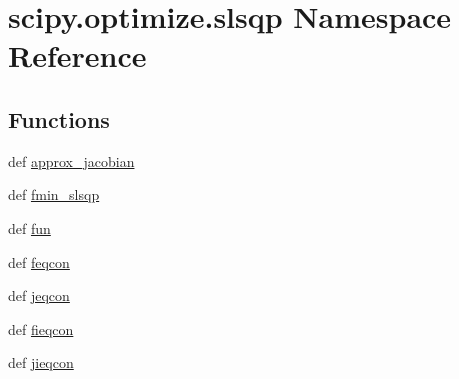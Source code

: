 \hypertarget{namespacescipy_1_1optimize_1_1slsqp}{}\section{scipy.\+optimize.\+slsqp Namespace Reference}
\label{namespacescipy_1_1optimize_1_1slsqp}
\subsection*{Functions}
\begin{DoxyCompactItemize}
\item 
def \hyperlink{namespacescipy_1_1optimize_1_1slsqp_a8bd7e9e2d35f751df61a44c3e0eb445a}{approx\+\_\+jacobian}
\item 
def \hyperlink{namespacescipy_1_1optimize_1_1slsqp_ac3dab30d04519a7fb85a62039512e338}{fmin\+\_\+slsqp}
\item 
def \hyperlink{namespacescipy_1_1optimize_1_1slsqp_a2b4ee77549a1bda7ea2001f9e1ec26c6}{fun}
\item 
def \hyperlink{namespacescipy_1_1optimize_1_1slsqp_a9c97c561709e3ca81b927f8b4231ef75}{feqcon}
\item 
def \hyperlink{namespacescipy_1_1optimize_1_1slsqp_a67cf78303222478a831e2b11c591a193}{jeqcon}
\item 
def \hyperlink{namespacescipy_1_1optimize_1_1slsqp_a1d304462271b6df17b4adaa71614caca}{fieqcon}
\item 
def \hyperlink{namespacescipy_1_1optimize_1_1slsqp_acebb941787a4b0b059a03be7bd77b7a5}{jieqcon}
\end{DoxyCompactItemize}

